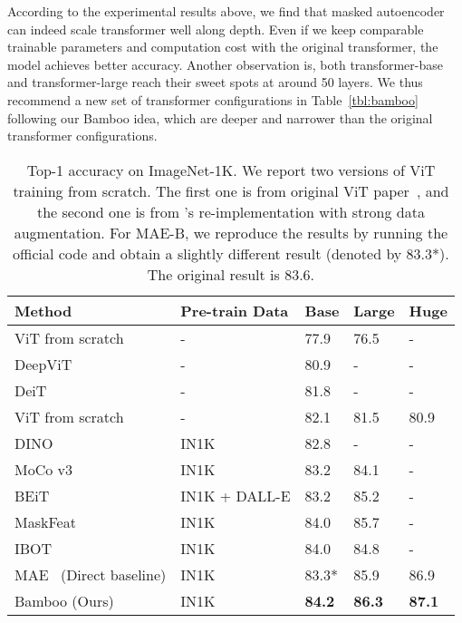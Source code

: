 \documentclass{article}
\theoremstyle{plain}
\theoremstyle{definition}
\theoremstyle{remark}
\begin{document}
According to the experimental results above, we find that masked autoencoder can indeed scale transformer well along depth. Even if we keep comparable trainable parameters and computation cost with the original transformer, the model achieves better accuracy. Another observation is, both transformer-base and transformer-large reach their sweet spots at around 50 layers. We thus recommend a new set of transformer configurations in Table~\ref{tbl:bamboo} following our Bamboo idea, which are deeper and narrower than the original transformer configurations.



\begin{table*}[t]
\caption{Top-1 accuracy on ImageNet-1K. We report two versions of ViT training from scratch. The first one is from original ViT paper~\citep{dosovitskiy2020image}, and the second one is from \citet{he2021masked}'s re-implementation with strong data augmentation. For MAE-B, we reproduce the results by running the official code and obtain a slightly different result (denoted by 83.3*). The original result is 83.6.}
\centering
\small
\begin{tabular}{l llll}

\toprule 
Method             & Pre-train Data    & Base & Large & Huge \\ \midrule
ViT from scratch~\citep{dosovitskiy2020image}            & - & 77.9 & 76.5 & - \\
DeepViT~\citep{zhou2021deepvit}             & - & 80.9 & - & - \\ 
DeiT~\citep{touvron2021training}             & - & 81.8 & - & - \\
ViT from scratch~\citep{he2021masked}            & - & 82.1 & 81.5 & 80.9  \\ \midrule
DINO~\citep{caron2021emerging}             & IN1K & 82.8 & - & -  \\
MoCo v3~\citep{chen2021empirical}             & IN1K & 83.2 & 84.1 & -  \\ \midrule
BEiT~\citep{bao2021beit}             & IN1K + DALL-E & 83.2 & 85.2 & -  \\
MaskFeat~\citep{wei2021masked}             & IN1K & 84.0 & 85.7 & -  \\
IBOT~\citep{zhou2021ibot}             & IN1K & 84.0 & 84.8 & -  \\ \midrule
MAE~\citep{he2021masked} (Direct baseline)           & IN1K & 83.3* & 85.9 & 86.9 \\
Bamboo (Ours)             & IN1K & \textbf{84.2} & \textbf{86.3} & \textbf{87.1} \\\bottomrule
\end{tabular}
\label{tbl:exp-cv-sota}
\vspace{-0.4cm}
\end{table*}
\end{document}
